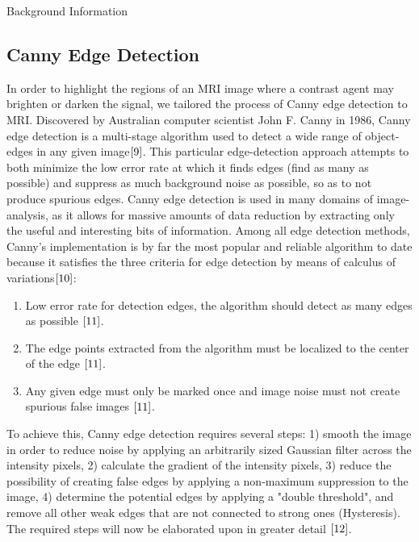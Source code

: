 \documentclass[a4paper,12pt]{article}
\begin{document}
\begin{section}{Background Information}

\subsection{Canny Edge Detection}

In order to highlight the regions of an MRI image where a contrast agent may brighten or darken the signal, we tailored the process of Canny edge detection to MRI. Discovered by Australian computer scientist John F. Canny in 1986, Canny edge detection is a multi-stage algorithm used to detect a wide range of object-edges in any given image$\cite{9}$.
This particular edge-detection approach attempts to both minimize the low error rate at which it finds edges (find as many as possible) and suppress as much background noise as possible, so as to not produce spurious edges. Canny edge detection is used in many domains of image-analysis, as it allows for massive amounts of data reduction by extracting only the useful and interesting bits of information. Among all edge detection methods, Canny's implementation is by far the most popular and reliable algorithm to date because it satisfies the three criteria for edge detection by means of calculus of variations$\cite{10}$:\\

\singlespacing
\begin{enumerate}
\item Low error rate for detection edges, the algorithm should detect as many edges as possible  $\cite{11}$.
\item The edge points extracted from the algorithm must be localized to the center of the edge  $\cite{11}$.
\item Any given edge must only be marked once and image noise must not create spurious false images  $\cite{11}$.
\end{enumerate}
\doublespacing

To achieve this, Canny edge detection requires several steps: 1) smooth the image in order to reduce noise by applying an arbitrarily sized Gaussian filter across the intensity pixels, 2) calculate the gradient of the intensity pixels, 3) reduce the possibility of creating false edges by applying a non-maximum suppression to the image, 4) determine the potential edges by applying a "double threshold", and remove all other weak edges that are not connected to strong ones (Hysteresis). The required steps will now be elaborated upon in greater detail $\cite{12}$.


\end{section}
\end{document}
